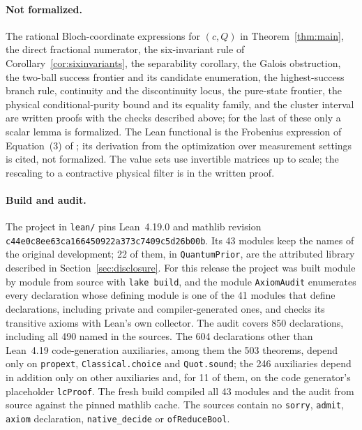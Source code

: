 \paragraph{Not formalized.}
The rational Bloch-coordinate expressions for $(c,Q)$ in
Theorem~\ref{thm:main}, the direct fractional numerator, the six-invariant
rule of Corollary~\ref{cor:sixinvariants}, the separability corollary, the
Galois obstruction, the two-ball success frontier and its candidate
enumeration, the highest-success branch rule, continuity and the
discontinuity locus, the pure-state frontier, the physical
conditional-purity bound and its equality family, and the cluster interval
are written proofs with the checks described above; for the last of these
only a scalar lemma is formalized. The Lean functional is the Frobenius
expression of Equation~(3) of \cite{ducuara}; its derivation from the
optimization over measurement settings is cited, not formalized. The value
sets use invertible matrices up to scale; the rescaling to a contractive
physical filter is in the written proof.

\paragraph{Build and audit.}
The project in \texttt{lean/} pins Lean~4.19.0 and mathlib revision
\texttt{c44e0c8e\allowbreak e63ca166\allowbreak 450922a3\allowbreak 73c7409c\allowbreak 5d26b00b}. Its 43 modules keep the
names of the original development; 22 of them, in \texttt{QuantumPrior},
are the attributed library described in Section~\ref{sec:disclosure}. For this release
the project was built module by module from source with
\texttt{lake build}, and the module \texttt{AxiomAudit} enumerates every
declaration whose defining module is one of the 41 modules that define
declarations, including private and compiler-generated ones, and checks its
transitive axioms with Lean's own collector. The audit covers 850
declarations, including all 490 named in the sources. The 604 declarations
other than Lean~4.19 code-generation auxiliaries, among them the 503
theorems, depend only on \texttt{propext}, \texttt{Classical.choice} and
\texttt{Quot.sound}; the 246 auxiliaries depend in addition only on other
auxiliaries and, for 11 of them, on the code generator's placeholder
\texttt{lcProof}. The fresh build compiled all 43 modules and the audit
from source against the pinned mathlib cache. The sources contain no
\texttt{sorry}, \texttt{admit}, \texttt{axiom} declaration,
\texttt{native\_decide} or \texttt{ofReduceBool}.
